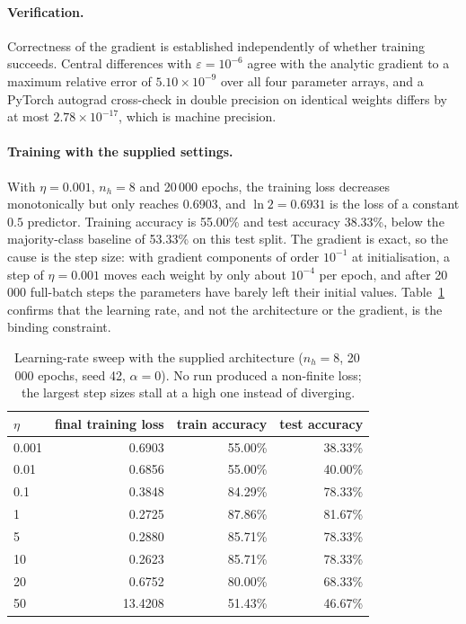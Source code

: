 \documentclass[11pt,a4paper]{article}
\begin{document}
\paragraph{Verification.} Correctness of the gradient is established independently
of whether training succeeds. Central differences with $\varepsilon=10^{-6}$ agree
with the analytic gradient to a maximum relative error of
$5.10\times 10^{-9}$ over all four parameter arrays, and a
PyTorch autograd cross-check in double precision on identical weights differs by at
most $2.78\times 10^{-17}$, which is machine precision.

\paragraph{Training with the supplied settings.} With
$\eta=0.001$, $n_h=8$ and 20\,000 epochs, the training loss decreases monotonically
but only reaches 0.6903, and $\ln 2 = 0.6931$ is
the loss of a constant $0.5$ predictor. Training accuracy is
55.00\% and test accuracy
38.33\%, below the majority-class baseline of
53.33\% on this test split. The gradient is exact,
so the cause is the step size: with gradient components of order $10^{-1}$ at
initialisation, a step of $\eta=0.001$ moves each weight by only about
$10^{-4}$ per epoch, and after 20\,000 full-batch steps the parameters have barely
left their initial values. Table~\ref{tab:lrsweep} confirms that the learning rate, and not the
architecture or the gradient, is the binding constraint.

\begin{table}[H]
\centering
\caption{Learning-rate sweep with the supplied architecture ($n_h=8$, 20\,000 epochs, seed 42, $\alpha=0$). No run produced a non-finite loss; the largest step sizes stall at a high one instead of diverging.}
\label{tab:lrsweep}
\begin{tabular}{lrrr}
\toprule
$\eta$ & final training loss & train accuracy & test accuracy \\
\midrule
0.001 & 0.6903 & 55.00\% & 38.33\% \\
0.01 & 0.6856 & 55.00\% & 40.00\% \\
0.1 & 0.3848 & 84.29\% & 78.33\% \\
1 & 0.2725 & 87.86\% & 81.67\% \\
5 & 0.2880 & 85.71\% & 78.33\% \\
10 & 0.2623 & 85.71\% & 78.33\% \\
20 & 0.6752 & 80.00\% & 68.33\% \\
50 & 13.4208 & 51.43\% & 46.67\% \\
\bottomrule
\end{tabular}
\end{table}
\end{document}
